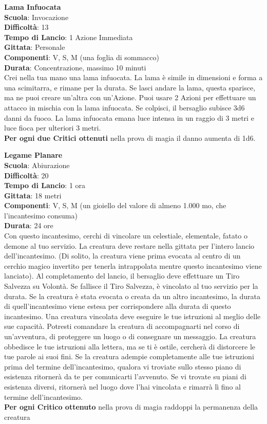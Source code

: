 \begin{multicols}{2}
\medskip\textbf{Lama Infuocata}\\
\textbf{Scuola}: Invocazione\\
\textbf{Difficoltà}:  13\\
\textbf{Tempo di Lancio}: 1 Azione Immediata\\
\textbf{Gittata}: Personale\\
\textbf{Componenti}: V, S, M (una foglia di sommacco)\\
\textbf{Durata}: Concentrazione, massimo 10 minuti \\
Crei nella tua mano una lama infuocata. La lama è simile in dimensioni e forma a una scimitarra, e rimane per la durata. Se lasci andare la lama, questa sparisce, ma ne puoi creare un'altra con un'Azione. Puoi usare 2 Azioni per effettuare un attacco in mischia con la lama infuocata. Se colpisci, il bersaglio subisce 3d6 danni da fuoco. La lama infuocata emana luce intensa in un raggio di 3 metri e luce fioca per ulteriori 3 metri.\\
\textbf{Per ogni due Critici ottenuti} nella prova di magia il danno aumenta di 1d6.

\medskip\textbf{Legame Planare}\\
\textbf{Scuola}: Abiurazione\\
\textbf{Difficoltà}:  20\\
\textbf{Tempo di Lancio}: 1 ora\\
\textbf{Gittata}: 18 metri\\
\textbf{Componenti}: V, S, M (un gioiello del valore di almeno 1.000 mo, che l'incantesimo consuma)\\
\textbf{Durata}: 24 ore\\
Con questo incantesimo, cerchi di vincolare un celestiale, elementale, fatato o demone al tuo servizio. La creatura deve restare nella gittata per l’intero lancio dell'incantesimo. (Di solito, la creatura viene prima evocata al centro di un cerchio magico invertito per tenerla intrappolata mentre questo incantesimo viene lanciato). Al completamento del lancio, il bersaglio deve effettuare un Tiro Salvezza su Volontà. Se fallisce il Tiro Salvezza, è vincolato al tuo servizio per la durata. Se la creatura è stata evocata o creata da un altro incantesimo, la durata di quell'incantesimo viene estesa per corrispondere alla durata di questo incantesimo. Una creatura vincolata deve eseguire le tue istruzioni al meglio delle sue capacità. Potresti comandare la creatura di accompagnarti nel corso di un'avventura, di proteggere un luogo o di consegnare un messaggio. La creatura obbedisce le tue istruzioni alla lettera, ma se ti è ostile, cercherà di distorcere le tue parole ai suoi fini. Se la creatura adempie completamente alle tue istruzioni prima del termine dell'incantesimo, qualora vi troviate sullo stesso piano di esistenza ritornerà da te per comunicarti l’avvenuto. Se vi trovate su piani di esistenza diversi, ritornerà nel luogo dove l’hai vincolata e rimarrà lì fino al termine dell'incantesimo.\\
\textbf{Per ogni Critico ottenuto} nella prova di magia raddoppi la permanenza della creatura


\end{multicols}
